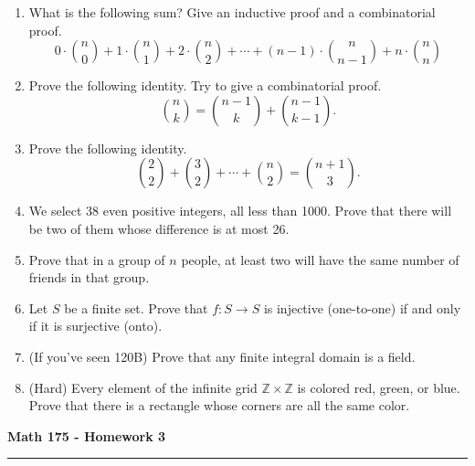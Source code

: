 \documentclass[11pt,letterpaper]{report}
\newcommand{\integers}{\mathbb{Z}}
\theoremstyle{definition}
\theoremstyle{remark}
\begin{document}
\begin{enumerate}
	\vfill

	\item What is the following sum? Give an inductive proof and a combinatorial proof.
	\[
	0\cdot \binom{n}{0} + 1\cdot \binom{n}{1} + 2\cdot \binom{n}{2} + \cdots + (n-1)\cdot\binom{n}{n-1} + n\cdot \binom{n}{n}
	\]
	\vfill\pagebreak

	\item Prove the following identity. Try to give a combinatorial proof.
	\[
	\binom{n}{k} = \binom{n-1}{k} + \binom{n-1}{k-1}.
	\]

	\vfill

	\item Prove the following identity.
	\[
	\binom{2}{2} + \binom{3}{2} + \cdots + \binom{n}{2} = \binom{n+1}{3}.
	\]

	\vfill

	\item We select 38 even positive integers, all less than 1000. Prove that there will be two of them whose difference is at most 26.

	\vfill

	\item Prove that in a group of $n$ people, at least two will have the same number of friends in that group.

	\vfill

	\item Let $S$ be a finite set. Prove that $f: S\to S$ is injective (one-to-one) if and only if it is surjective (onto).\\

	\vfill

	\item (If you've seen 120B) Prove that any finite integral domain is a field.

	\vfill

	\item (Hard) Every element of the infinite grid $\integers\times \integers$ is colored red, green, or blue. Prove that there is a rectangle whose corners are all the same color.
	\vfill

\end{enumerate}
\pagebreak

\begin{center}
{\bf \Large Math 175 - Homework 3}
\vspace{0.2cm}
\hrule
\end{center}
\end{document}
